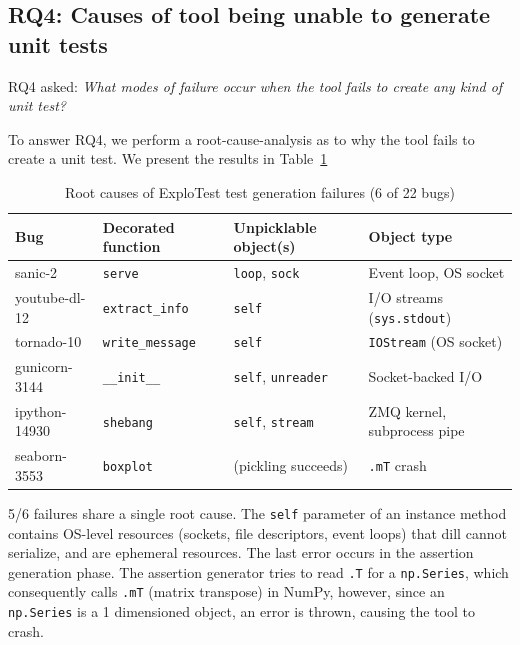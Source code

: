 \subsection{RQ4: Causes of tool being unable to generate unit tests}
RQ4 asked: \textit{What modes of failure occur when the tool fails to create any kind of unit test?}

To answer RQ4, we perform a root-cause-analysis as to why the tool fails to create a unit test. We present the results in Table~\ref{tab:rq4-failures}

\begin{table}[ht]
    \centering
    \caption{Root causes of ExploTest test generation failures (6 of 22 bugs)}
    \label{tab:rq4-failures}
    \begin{tabular}{llll}
        \toprule
        \textbf{Bug}  & \textbf{Decorated function} & \textbf{Unpicklable object(s)}   & \textbf{Object type}              \\
        \midrule
        sanic-2       & \texttt{serve}              & \texttt{loop}, \texttt{sock}     & Event loop, OS socket             \\
        youtube-dl-12 & \texttt{extract\_info}      & \texttt{self}                    & I/O streams (\texttt{sys.stdout}) \\
        tornado-10    & \texttt{write\_message}     & \texttt{self}                    & \texttt{IOStream} (OS socket)     \\
        gunicorn-3144 & \texttt{\_\_init\_\_}       & \texttt{self}, \texttt{unreader} & Socket-backed I/O                 \\
        ipython-14930 & \texttt{shebang}            & \texttt{self}, \texttt{stream}   & ZMQ kernel, subprocess pipe       \\
        \midrule
        seaborn-3553  & \texttt{boxplot}            & (pickling succeeds)              & \texttt{.mT} crash                \\
        \bottomrule
    \end{tabular}
\end{table}

5/6 failures share a single root cause. The \verb|self| parameter of an instance method contains OS-level resources (sockets, file descriptors, event loops)
that dill cannot serialize, and are ephemeral resources. The last error occurs in the assertion generation phase. The assertion generator tries to read
\verb|.T| for a \verb|np.Series|, which consequently calls \verb|.mT| (matrix transpose) in NumPy, however, since an \verb|np.Series| is a 1 dimensioned object,
an error is thrown, causing the tool to crash.

